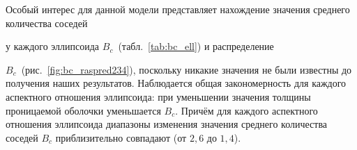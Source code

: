 





Особый интерес для данной модели представляет нахождение значения среднего количества соседей

у каждого эллипсоида ${B_c}$~(табл.~\ref{tab:bc_ell}) и распределение

${B_c}$~(рис.~\ref{fig:bc_raspred234}), поскольку никакие значения не были известны до получения наших результатов. Наблюдается общая закономерность для каждого аспектного отношения эллипсоида: при уменьшении значения толщины проницаемой оболочки уменьшается $B_c$. Причём  для каждого аспектного отношения эллипсоида диапазоны изменения значения среднего количества соседей ${B_c}$ приблизительно совпадают (от $2,6$ до $1,4$).



